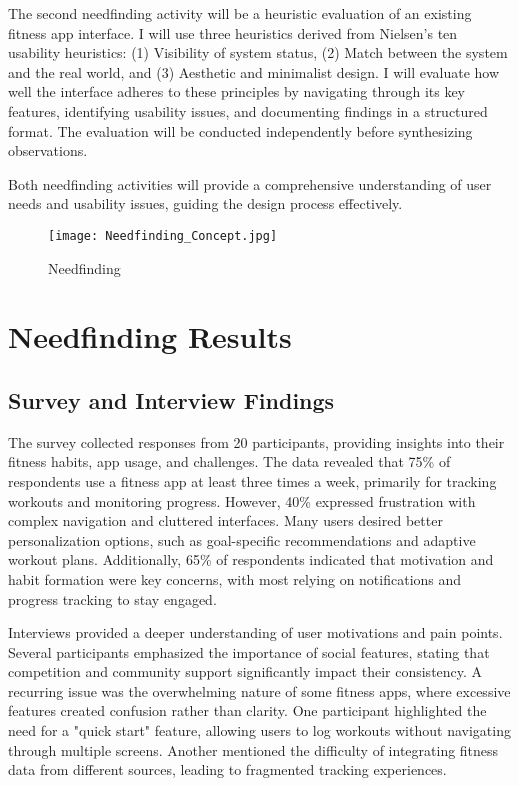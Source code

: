 \documentclass[
	letterpaper, %
]{jdf}
\begin{document}
The second needfinding activity will be a heuristic evaluation of an existing fitness app interface. I will use three heuristics derived from Nielsen’s ten usability heuristics: (1) Visibility of system status, (2) Match between the system and the real world, and (3) Aesthetic and minimalist design. I will evaluate how well the interface adheres to these principles by navigating through its key features, identifying usability issues, and documenting findings in a structured format. The evaluation will be conducted independently before synthesizing observations.

Both needfinding activities will provide a comprehensive understanding of user needs and usability issues, guiding the design process effectively.

\begin{figure}
    \centering
    \texttt{[image: Needfinding\_Concept.jpg]}
    \caption{Needfinding}
    \label{fig:enter-label}
\end{figure}

\hfill \hfill

\section{Needfinding Results }
\subsection {Survey and Interview Findings}
The survey collected responses from 20 participants, providing insights into their fitness habits, app usage, and challenges. The data revealed that 75\% of respondents use a fitness app at least three times a week, primarily for tracking workouts and monitoring progress. However, 40\% expressed frustration with complex navigation and cluttered interfaces. Many users desired better personalization options, such as goal-specific recommendations and adaptive workout plans. Additionally, 65\% of respondents indicated that motivation and habit formation were key concerns, with most relying on notifications and progress tracking to stay engaged.

Interviews provided a deeper understanding of user motivations and pain points. Several participants emphasized the importance of social features, stating that competition and community support significantly impact their consistency. A recurring issue was the overwhelming nature of some fitness apps, where excessive features created confusion rather than clarity. One participant highlighted the need for a "quick start" feature, allowing users to log workouts without navigating through multiple screens. Another mentioned the difficulty of integrating fitness data from different sources, leading to fragmented tracking experiences.
\end{document}
